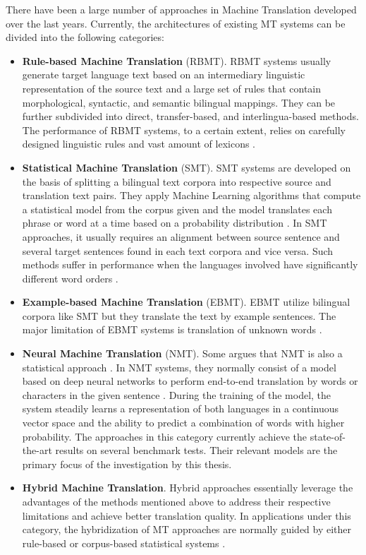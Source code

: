 There have been a large number of approaches in Machine Translation developed over the last years. Currently, the architectures of existing MT systems can be divided into the following categories: 

\begin{itemize}
\item \textbf{Rule-based Machine Translation} (RBMT). RBMT systems usually generate target language text based on an intermediary linguistic representation of the source text and a large set of rules that contain morphological, syntactic, and semantic bilingual mappings. They can be further subdivided into direct, transfer-based, and interlingua-based methods. The performance of RBMT systems, to a certain extent, relies on carefully designed linguistic rules and vast amount of lexicons \cite{Moussallem2017}.
\item \textbf{Statistical Machine Translation} (SMT). SMT systems are developed on the basis of splitting a bilingual text corpora into respective source and translation text pairs. They apply Machine Learning algorithms that compute a statistical model from the corpus given and the model translates each phrase or word at a time based on a probability distribution \cite{Moussallem2017}. In SMT approaches, it usually requires an alignment between source sentence and several target sentences found in each text corpora and vice versa. Such methods suffer in performance when the languages involved have significantly different word orders \cite{okpor2014machine}.
\item \textbf{Example-based Machine Translation} (EBMT). EBMT utilize bilingual corpora like SMT but they translate the text by example sentences. The major limitation of EBMT systems is translation of unknown words \cite{Moussallem2017}. 
\item \textbf{Neural Machine Translation} (NMT). Some argues that NMT is also a statistical approach \cite{Moussallem2017}. In NMT systems, they normally consist of a model based on deep neural networks to perform end-to-end translation by words or characters in the given sentence \cite{Moussallem2017}. During the training of the model, the system steadily learns a representation of both languages in a continuous vector space and the ability to predict a combination of words with higher probability. The approaches in this category currently achieve the state-of-the-art results on several benchmark tests. Their relevant models are the primary focus of the investigation by this thesis.
\item \textbf{Hybrid Machine Translation}. Hybrid approaches essentially leverage the advantages of the methods mentioned above to address their respective limitations and achieve better translation quality. In applications under this category, the hybridization of MT approaches are normally guided by either rule-based or corpus-based statistical systems \cite{costa2015latest}.
\end{itemize}

